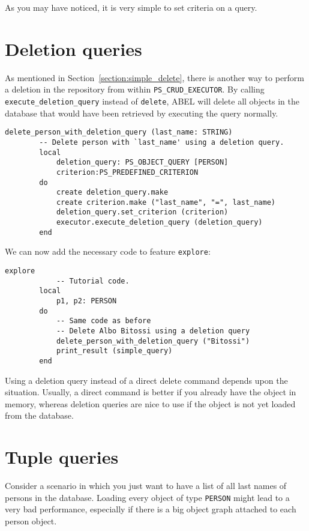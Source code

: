 \documentclass[a4paper,12pt]{report}
\begin{document}
As you may have noticed, it is very simple to set criteria on a query.

\section{Deletion queries}
\label{section:deletion_query}

As mentioned in Section~\ref{section:simple_delete}, there is another way to perform a deletion in the repository from within
\lstinline!PS_CRUD_EXECUTOR!. By calling \lstinline{execute_deletion_query} instead of \lstinline{delete}, ABEL will delete all objects in the database that would have been retrieved by executing the query normally.

\begin{lstlisting}[language=OOSC2Eiffel, captionpos=b, caption={Using a deletion query.}, label={lst:deletion_query}]
	delete_person_with_deletion_query (last_name: STRING)
		-- Delete person with `last_name' using a deletion query.
		local
			deletion_query: PS_OBJECT_QUERY [PERSON]
			criterion:PS_PREDEFINED_CRITERION
		do
			create deletion_query.make
			create criterion.make ("last_name", "=", last_name)
			deletion_query.set_criterion (criterion)
			executor.execute_deletion_query (deletion_query)
		end
\end{lstlisting}

We can now add the necessary code to feature \lstinline{explore}:  
\begin{lstlisting}[language=OOSC2Eiffel, captionpos=b, caption={Invoking the code that searches for Albo Bitossi}, label={lst:tutorial_print_result}]
	explore
			-- Tutorial code.
		local
			p1, p2: PERSON
		do
			-- Same code as before
			-- Delete Albo Bitossi using a deletion query
			delete_person_with_deletion_query ("Bitossi")
			print_result (simple_query)
		end
\end{lstlisting}
Using a deletion query instead of a direct delete command depends upon the situation. Usually, a direct command is better if you already have the object in memory, whereas deletion queries are nice to use if the object is not yet loaded from the database.

\section{Tuple queries}

Consider a scenario in which you just want to have a list of all last names of persons in the database. Loading every object of type \lstinline!PERSON! might lead to a very bad performance, especially if there is a big object graph attached to each person object.
\end{document}
